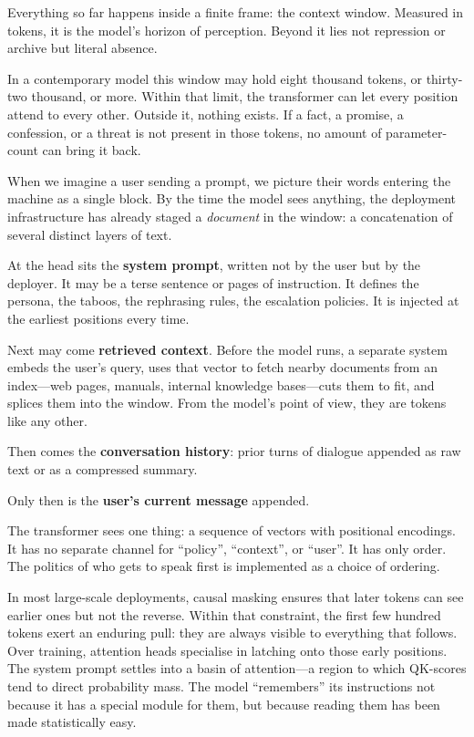 \documentclass[12pt,a4paper]{article}
\begin{document}
Everything so far happens inside a finite frame: the context window. Measured in tokens, it is the model's horizon of perception. Beyond it lies not repression or archive but literal absence.

In a contemporary model this window may hold eight thousand tokens, or thirty-two thousand, or more. Within that limit, the transformer can let every position attend to every other. Outside it, nothing exists. If a fact, a promise, a confession, or a threat is not present in those tokens, no amount of parameter-count can bring it back.

When we imagine a user sending a prompt, we picture their words entering the machine as a single block. By the time the model sees anything, the deployment infrastructure has already staged a \emph{document} in the window: a concatenation of several distinct layers of text.

At the head sits the \textbf{system prompt}, written not by the user but by the deployer. It may be a terse sentence or pages of instruction. It defines the persona, the taboos, the rephrasing rules, the escalation policies. It is injected at the earliest positions every time.

Next may come \textbf{retrieved context}. Before the model runs, a separate system embeds the user's query, uses that vector to fetch nearby documents from an index---web pages, manuals, internal knowledge bases---cuts them to fit, and splices them into the window. From the model's point of view, they are tokens like any other.

Then comes the \textbf{conversation history}: prior turns of dialogue appended as raw text or as a compressed summary.

Only then is the \textbf{user's current message} appended.

The transformer sees one thing: a sequence of vectors with positional encodings. It has no separate channel for ``policy'', ``context'', or ``user''. It has only order. The politics of who gets to speak first is implemented as a choice of ordering.

In most large-scale deployments, causal masking ensures that later tokens can see earlier ones but not the reverse. Within that constraint, the first few hundred tokens exert an enduring pull: they are always visible to everything that follows. Over training, attention heads specialise in latching onto those early positions. The system prompt settles into a basin of attention---a region to which QK-scores tend to direct probability mass. The model ``remembers'' its instructions not because it has a special module for them, but because reading them has been made statistically easy.
\end{document}
